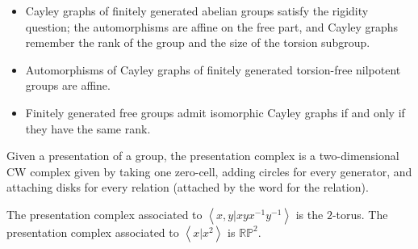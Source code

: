 \documentclass[10pt]{mypackage}
\begin{document}
\begin{itemize}
  \item Cayley graphs of finitely generated abelian groups satisfy the rigidity question; the automorphisms are affine on the free part, and Cayley graphs remember the rank of the group and the size of the torsion subgroup.
  \item Automorphisms of Cayley graphs of finitely generated torsion-free nilpotent groups are affine.
  \item Finitely generated free groups admit isomorphic Cayley graphs if and only if they have the same rank.
\end{itemize}
Given a presentation of a group, the presentation complex is a two-dimensional CW complex given by taking one zero-cell, adding circles for every generator, and attaching disks for every relation (attached by the word for the relation).

The presentation complex associated to $ \left\langle x,y | xyx^{-1}y^{-1} \right\rangle $ is the $2$-torus. The presentation complex associated to $ \left\langle x|x^2 \right\rangle $ is $ \mathbb{RP}^2 $.
\end{document}
